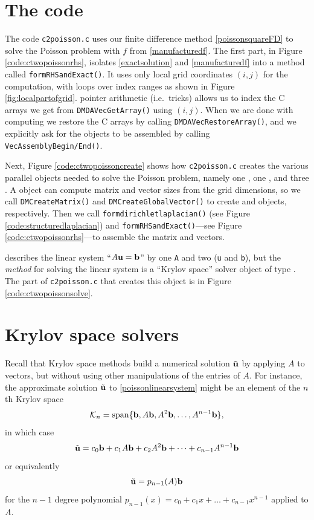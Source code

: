 \section{The code}

The code \texttt{c2poisson.c} uses our finite difference method \eqref{poissonsquareFD} to solve the Poisson problem with $f$ from \eqref{manufacturedf}.  The first part, in Figure \ref{code:ctwopoissonrhs}, isolates \eqref{exactsolution} and \eqref{manufacturedf} into a method called \texttt{formRHSandExact()}.  It uses only local grid coordinates $(i,j)$ for the computation, with loops over index ranges as shown in Figure \ref{fig:localpartofgrid}. \PETSc pointer arithmetic (i.e.~tricks) allows us to index the C arrays we get from \texttt{DMDAVecGetArray()} using $(i,j)$.  When we are done with computing \pVecs we restore the C arrays by calling \texttt{DMDAVecRestoreArray()}, and we explicitly ask for the \pVec objects to be assembled by calling \texttt{VecAssemblyBegin/End()}.

Next, Figure \ref{code:ctwopoissoncreate} shows how \texttt{c2poisson.c} creates the various parallel objects needed to solve the Poisson problem, namely one \pDM, one \pMat, and three \pVecs.  A \pDM object can compute matrix and vector sizes from the grid dimensions, so we call \texttt{DMCreateMatrix()} and \texttt{DMCreateGlobalVector()} to create \pMat and \pVec objects, respectively.  Then we call \texttt{formdirichletlaplacian()} (see Figure \ref{code:structuredlaplacian}) and \texttt{formRHSandExact()}---see Figure \ref{code:ctwopoissonrhs}---to assemble the matrix and vectors.


\PETSc describes the linear system ``$A\mathbf{u}=\mathbf{b}$'' by one \pMat \texttt{A} and two \pVecs (\texttt{u} and \texttt{b}), but the \emph{method} for solving the linear system is a ``Krylov space'' solver object of type \pKSP.  The part of \texttt{c2poisson.c} that creates this object is in Figure \ref{code:ctwopoissonsolve}.


\section{Krylov space solvers}

Recall that Krylov space methods \citep{TrefethenBau} build a numerical solution $\tilde{\mathbf{u}}$ by applying $A$ to vectors, but without using other manipulations of the entries of $A$.  For instance, the approximate solution $\tilde{\mathbf{u}}$ to \eqref{poissonlinearsystem} might be an element of the $n$th Krylov space
    $$\mathcal{K}_n = \operatorname{span}\{\mathbf{b},A\mathbf{b},A^2\mathbf{b},\dots,A^{n-1}\mathbf{b}\},$$
in which case
    $$\tilde{\mathbf{u}} = c_0 \mathbf{b} + c_1 A \mathbf{b} + c_2 A^2 \mathbf{b} + \dots + c_{n-1} A^{n-1} \mathbf{b}$$
or equivalently
    $$\tilde{\mathbf{u}} = p_{n-1}(A) \mathbf{b}$$
for the $n-1$ degree polynomial $p_{n-1}(x) = c_0 + c_1 x + \dots + c_{n-1} x^{n-1}$ applied to $A$.

